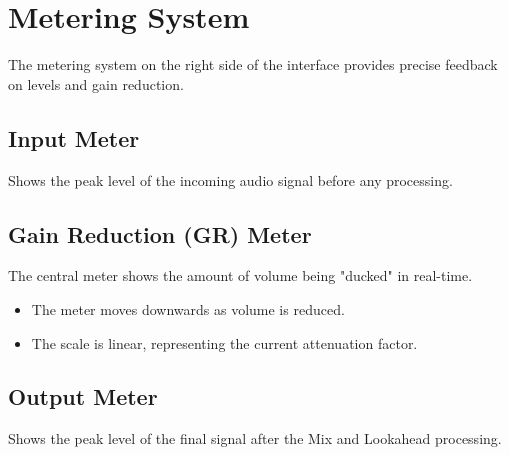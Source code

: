 \chapter{Metering System}
\label{ch:metering_system}

The metering system on the right side of the interface provides precise feedback on levels and gain reduction.

\section{Input Meter}
Shows the peak level of the incoming audio signal before any processing.

\section{Gain Reduction (GR) Meter}
The central meter shows the amount of volume being "ducked" in real-time. 
\begin{itemize}
    \item The meter moves downwards as volume is reduced.
    \item The scale is linear, representing the current attenuation factor.
\end{itemize}

\section{Output Meter}
Shows the peak level of the final signal after the Mix and Lookahead processing.
